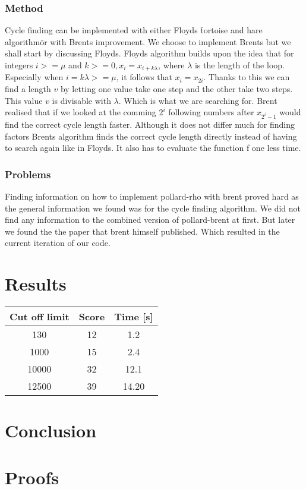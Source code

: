 \documentclass[a4paper, 12pt]{report}
\begin{document}
\subsection{Method}
Cycle finding can be implemented with either Floyds \"tortoise and hare algorithm\" or with Brents improvement. We choose to implement Brents but we shall start by discussing Floyds. Floyds algorithm builds upon the idea that for integers $i >= \mu$ and $k >= 0, x_i = x_{i + k\lambda}$, where $\lambda$ is the length of the loop. Especially when $i = k\lambda >= \mu$, it follows that $x_i = x_{2i}$. Thanks to this we can find a length $v$ by letting one value take one step and the other take two steps. This value $v$ is divisable with $\lambda$. Which is what we are searching for. Brent realised that if we looked at the comming $2^i$ following numbers after $x_{2^i-1}$ would find the correct cycle length faster. Although it does not differ much for finding factors Brents algorithm finds the correct cycle length directly instead of having to search again like in Floyds. It also has to evaluate the function f one less time.


\subsection{Problems}
Finding information on how to implement pollard-rho with brent proved hard as the general information we found was for the cycle finding algorithm. We did not find any information to the combined version of pollard-brent at first. But later we found the the paper that brent himself published. Which resulted in the current iteration of our code.
\chapter{Results}

\begin{tabular} {c c c}
Cut off limit 	&	 Score 	& Time [s] \\ \hline
130		&	12		& 1.2 \\
1000	&	15		& 2.4 \\
10000 	& 	32		& 12.1 \\
12500	&	39		&14.20 \\

\end{tabular}
\chapter{Conclusion}
\appendix
\chapter{Proofs}
\end{document}
